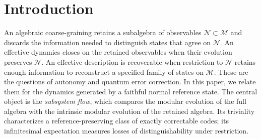 \documentclass[a4paper,11pt]{article}
\theoremstyle{definition}
\begin{document}
\section{Introduction}\label{sec:intro}

An algebraic coarse-graining retains a subalgebra of observables $\mathcal N\subset\mathcal M$ and discards the information needed to distinguish states that agree on $\mathcal N$. An effective dynamics closes on the retained observables when their evolution preserves $\mathcal N$. An effective description is recoverable when restriction to $\mathcal N$ retains enough information to reconstruct a specified family of states on $\mathcal M$. These are the questions of autonomy and quantum error correction. In this paper, we relate them for the dynamics generated by a faithful normal reference state. The central object is the \emph{subsystem flow}, which compares the modular evolution of the full algebra with the intrinsic modular evolution of the retained algebra. Its triviality characterizes a reference-preserving class of exactly correctable codes; its infinitesimal expectation measures losses of distinguishability under restriction.
\end{document}
